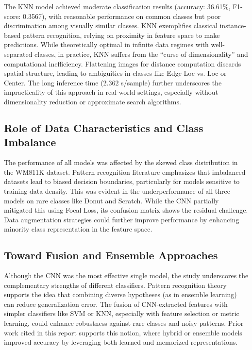 \documentclass[conference]{IEEEtran}
\begin{document}
The KNN model achieved moderate classification results (accuracy: 36.61\%, F1-score: 0.3567), with reasonable performance on common classes but poor discrimination among visually similar classes. 
KNN exemplifies classical instance-based pattern recognition, relying on proximity in feature space to make predictions. 
While theoretically optimal in infinite data regimes with well-separated classes, in practice, KNN suffers from the “curse of dimensionality” and computational inefficiency. 
Flattening images for distance computation discards spatial structure, leading to ambiguities in classes like Edge-Loc vs. Loc or Center. 
The long inference time (2.362 s/sample) further underscores the impracticality of this approach in real-world settings, especially without dimensionality reduction or approximate search algorithms.

\subsection{Role of Data Characteristics and Class Imbalance}
The performance of all models was affected by the skewed class distribution in the WM811K dataset. 
Pattern recognition literature emphasizes that imbalanced datasets lead to biased decision boundaries, particularly for models sensitive to training data density. 
This was evident in the underperformance of all three models on rare classes like Donut and Scratch. 
While the CNN partially mitigated this using Focal Loss, its confusion matrix shows the residual challenge. 
Data augmentation strategies could further improve performance by enhancing minority class representation in the feature space.

\subsection{Toward Fusion and Ensemble Approaches}
Although the CNN was the most effective single model, the study underscores the complementary strengths of different classifiers. 
Pattern recognition theory supports the idea that combining diverse hypotheses (as in ensemble learning) can reduce generalization error. 
The fusion of CNN-extracted features with simpler classifiers like SVM or KNN, especially with feature selection or metric learning, could enhance robustness against rare classes and noisy patterns. 
Prior work cited in this report supports this notion, where hybrid or ensemble models improved accuracy by leveraging both learned and memorized representations.
\end{document}

